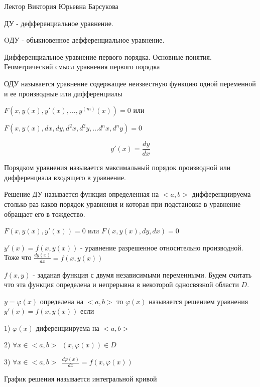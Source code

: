Лектор Виктория Юрьевна Барсукова

ДУ - дефференциальное уравнение.

OДУ - обыкновенное дефференциальное уравнение.

\begin{title}[\Large]
  Дифференциальное уравнение первого порядка. Основные понятия. Геометрический
  смысл уравнения первого порядка
\end{title}

\begin{define}
  ОДУ называется уравнение содержащее неизвестную функцию одной переменной и ее
  производные или дифференциалы

  $F(x, y(x), y'(x), \ldots, y^{(m)} (x)) = 0$ или


  $F(x, y(x), dx, dy, d^2 x, d^2 y, \ldots d^n x, d^n y) = 0$

  $$
  y'(x) = \frac{dy}{dx}
  $$
\end{define}

\begin{define}
  Порядком уравнения называется максимальный порядок производной или
  дифференциала входящего в уравнение.
\end{define}

\begin{define}[решения ДУ]
  Решение ДУ называется функция определенная на $<a,b>$ дифференциируема столько
  раз каков порядок уравнения и которая при подстановке в уравнение обращает его
  в тождество.
\end{define}

\begin{block}[ДУ 1 порядка]
  $F(x, y(x), y'(x)) = 0$ или $F(x, y(x), dy, dx) = 0$

  $y'(x) = f(x, y(x))$ - уравнение разрешенное относительно производной. Тоже
  что $\frac{dy(x)}{dx} = f(x, y(x))$

  $f(x, y)$ - заданая функция с двумя независимыми переменными. Будем считать
  что эта функция определена и непрерывна в некоторой односвязной области $D$.
\end{block}

\begin{define}
  $y = \varphi (x)$ определена на $<a,b>$ то $\varphi (x)$
  называется решением уравнения $y'(x) = f(x, y(x))$ если

  1) $\varphi (x)$ диференциируема на $<a,b>$

  2) $\forall x \in <a,b> ~~ (x, \varphi(x)) \in D$

  3) $\forall x \in <a,b> ~~ \frac{d\varphi (x)}{dx} = f(x, \varphi(x))$

  График решения называется интегральной кривой
\end{define}


